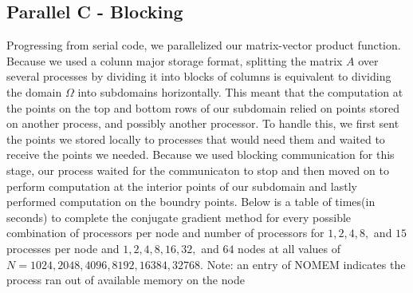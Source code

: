 \documentclass[11pt]{article}
\begin{document}
\subsection{Parallel C - Blocking}
Progressing from serial code, we parallelized our matrix-vector product function. Because we used a colunn major storage format, splitting the matrix $A$ over several processes by dividing it into blocks of columns is equivalent to dividing the domain $\Omega$ into subdomains horizontally. This meant that the computation at the points on the top and bottom rows of our subdomain relied on points stored on another process, and possibly another processor. To handle this, we first sent the points we stored locally to processes that would need them and waited to receive the points we needed. Because we used blocking communication for this stage, our process waited for the communicaton to stop and then moved on to perform computation at the interior points of our subdomain and lastly performed computation on the boundry points.
Below is a table of times(in seconds) to complete the conjugate gradient method for every possible combination of processors per node and number of processors for $1,2,4,8,$ and $15$ processes per node and $1,2,4,8,16,32,$ and $64$ nodes at all values of $N=1024, 2048, 4096, 8192, 16384, 32768$. Note: an entry of NOMEM indicates the process ran out of available memory on the node
\end{document}

